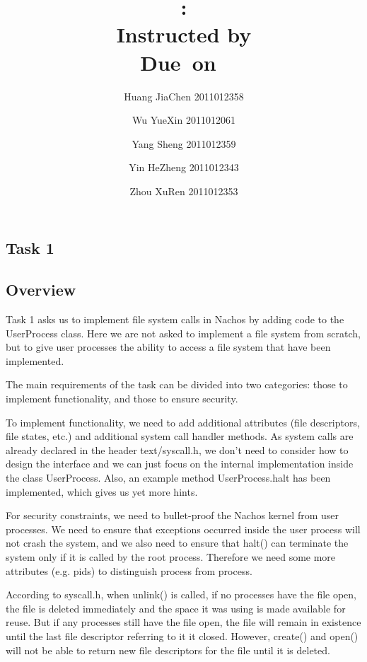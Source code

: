 \documentclass{article}
\title{\textmd{\bf \Class: \Title}\\{\large Instructed by \textit{\ClassInstructor}}\\\normalsize\vspace{0.1in}\small{Due\ on\ \DueDate}}
\date{}
\author{%
  Huang JiaChen 2011012358 \and
  Wu YueXin 2011012061 \and
  Yang Sheng 2011012359 \and
  Yin HeZheng 2011012343 \and
  Zhou XuRen 2011012353}
\begin{document}
  \begin{spacing}{1.1}
    \maketitle \thispagestyle{empty}



\section{Task 1}
\subsection{Overview}
Task 1 asks us to implement file system calls  in Nachos by adding code to the \textsf{UserProcess} class. Here we are not asked to implement a file system from scratch, but to give user processes the ability to access a file system that have been implemented.

The main requirements of the task can be divided into two categories: those to implement functionality, and those to ensure security.

To implement functionality, we need to add additional attributes (file descriptors, file states, etc.) and additional system call handler methods. As system calls are already declared in the header \textsf{text/syscall.h}, we don't need to consider how to design the interface and we can just focus on the internal implementation inside the class \textsf{UserProcess}. Also, an example method \textsf{UserProcess.halt} has been implemented, which gives us yet more hints.

For security constraints, we need to bullet-proof the Nachos kernel from user processes. We need to ensure that exceptions occurred inside the user process will not crash the system, and we also need to ensure that \textsf{halt()} can terminate the system only if it is called by the root process. Therefore we need some more attributes (e.g. pids) to distinguish process from process.

According to \textsf{syscall.h}, when \textsf{unlink}() is called,  if no processes have the file open, the file is deleted immediately and the space it was using is made available for reuse. But if any processes still have the file open, the file will remain in existence until the last file descriptor referring to it it closed. However, \textsf{create}() and \textsf{open}() will not be able to return new file descriptors for the file until it is deleted.


\end{spacing}
\end{document}
